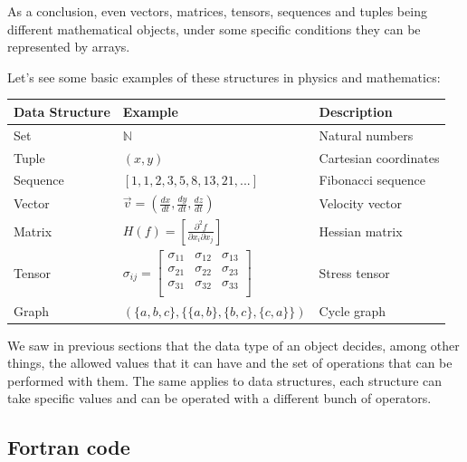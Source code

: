 As a conclusion, even vectors, matrices, tensors, sequences and tuples being different mathematical objects, 
under some specific conditions they can be represented by arrays.

Let's see some basic examples of these structures in physics and mathematics:
\vspace{0.5cm}
\begin{table}[!h]
    \centering
    \begin{tabular}{|l|l|l|}
        \hline
        \textbf{Data Structure}  & \textbf{Example}  & \textbf{Description}  \\ \hline
        Set  & $\mathbb{N}$ & Natural numbers \\ \hline
        Tuple  & $(x,y)$ & Cartesian coordinates \\ \hline
        Sequence  & $[1,1,2,3,5,8,13,21,...]$ & Fibonacci sequence \\ \hline
        Vector  & $\vec{v} = (\frac{dx}{dt},\frac{dy}{dt},\frac{dz}{dt})$ & Velocity vector \\ \hline
        Matrix  & $H(f) = \left[ \frac{\partial^2f}{\partial x_i\partial x_j} \right]$  &   Hessian matrix   \\ \hline
        Tensor & $\sigma_{ij} = \left[{\begin{matrix}
                \sigma _{11} & \sigma _{12} & \sigma _{13} \\
                \sigma _{21} & \sigma _{22} & \sigma _{23} \\
                \sigma _{31} & \sigma _{32} & \sigma _{33} \\
        \end{matrix}}\right]$ & Stress tensor \\ \hline
        Graph  & $(\{a,b,c\}, \{\{a,b\},\{b,c\},\{c,a\}\})$ & Cycle graph  \\ \hline
    \end{tabular}
\end{table}

We saw in previous sections that the data type of an object decides, among other things, 
the allowed values that it can have and 
the set of operations that can be performed with them. 
The same applies to data structures, each structure can take specific values and 
can be operated with a different bunch of operators.






        \newpage
        \subsection*{Fortran code}
        
